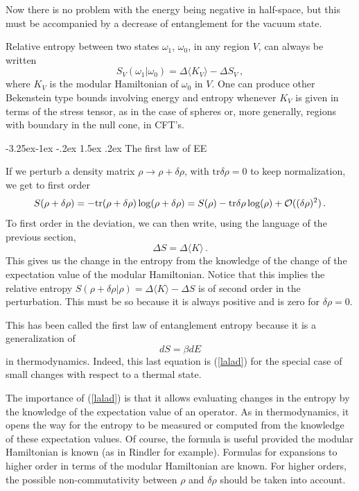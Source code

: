 \documentclass[11pt]{article}
\makeatletter
\renewcommand\subsection{\@startsection{subsection}{2}{\z@}%
                                   {-3.25ex\@plus -1ex \@minus -.2ex}%
                                     {1.5ex \@plus .2ex}%
                                     {\normalfont\bfseries}}
\numberwithin{equation}{section}
\newcommand{\be}{\begin{equation}}
\newcommand{\ee}{\end{equation}}
\makeatother
\begin{document}
Now there is no problem with the energy being negative in half-space, but this must be accompanied by a decrease of entanglement for the vacuum state.  

Relative entropy between two states $\omega_1$, $\omega_0$, in any region $V$, can always be written 
\be
S_V(\omega_1|\omega_0)=\Delta \langle K_V \rangle - \Delta S_V\,,
\ee
where $K_V$ is the modular Hamiltonian of $\omega_0$ in $V$. One can produce other Bekenstein type bounds involving energy and entropy whenever $K_V$ is given in terms of the stress tensor, as in the case of spheres or, more generally, regions with boundary in the null cone, in CFT's. 


\subsection{The first law of EE}

If we perturb a density matrix $\rho \rightarrow \rho+\delta \rho$, with $\textrm{tr} \delta \rho=0$ to keep normalization, we get to first order
\be
S(\rho+\delta\rho)= - \textrm{tr}  (\rho+\delta\rho) \log(\rho+\delta\rho)
=S(\rho)- \textrm{tr}  \delta\rho \log(\rho)+{\cal O}((\delta \rho)^2)\,.
\ee
To first order in the deviation, we can then write, using the language of the previous section, 
\be
\Delta S=\Delta \langle K\rangle\,.\label{lalad}
\ee
This gives us the change in the entropy from the knowledge of the change of the expectation value of the modular Hamiltonian. Notice that this implies the relative entropy $S(\rho+\delta \rho |\rho)=\Delta \langle K \rangle-\Delta S$ is of second order in the perturbation. This must be so because it is always positive and is zero for $\delta \rho=0$.

This has been called the first law of entanglement entropy because it is a generalization of 
\be
dS=\beta dE
\ee
in thermodynamics. Indeed, this last equation is (\ref{lalad}) for the special case of small changes with respect to a thermal state.    

The importance of (\ref{lalad}) is that it allows evaluating changes in the entropy by the knowledge of the expectation value of an operator. As in thermodynamics, it opens the way for the entropy to be measured or computed from the knowledge of these expectation values. Of course, the formula is useful provided the modular Hamiltonian is known (as in Rindler for example). Formulas for expansions to higher order in terms of the modular Hamiltonian are known. For higher orders, the possible non-commutativity between $\rho$ and $\delta \rho$ should be taken into account.  
\end{document}
